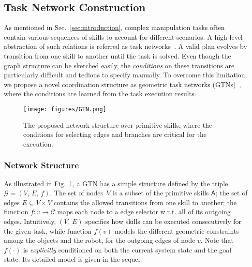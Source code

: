 \subsection{Task Network Construction}\label{subsec:task-network}

As mentioned in Sec.~\ref{sec:introduction}, complex manipulation tasks often contain various sequences of skills to account for different scenarios. 
A high-level abstraction of such relations is referred as task networks~\cite{hayes2016autonomously}.
A valid plan evolves by transition from one skill to another until the task is solved. 
Even though the graph structure can be sketched easily, 
the \emph{conditions} on these transitions are particularly difficult and tedious to specify manually. 
To overcome this limitation,
we propose a novel coordination structure as geometric task networks (GTNs)~\cite{guo2021geometric}, 
where the conditions are learned from the task execution results.


\begin{figure}[t!]
    \centering
    \texttt{[image: figures/GTN.png]}
    \caption{The proposed network structure over primitive skills, 
      where the conditions for selecting edges and branches are critical for the execution.}
    \label{fig:gtn}
    \vspace{-0.15cm}
\end{figure}

\subsubsection{Network Structure}\label{subsubsec:gtn-structure}
As illustrated in Fig.~\ref{fig:gtn}, a GTN has a simple structure defined by the triple $\mathcal{G}=(V,\, E,\, f)$.
The set of nodes~$V$ is a subset of the primitive skills $\mathsf{A}$;
the set of edges $E \subseteq V \times V$ contains the allowed transitions from one skill to another;
the function $f: v \rightarrow \mathcal{C}$ maps each node to a edge selector w.r.t. all of its outgoing edges.
Intuitively, $(V,\, E)$ specifies how skills can be executed consecutively for the given task,
while function $f(v)$ models the different geometric constraints among the objects and the robot,
for the outgoing edges of node $v$.
Note that $f(\cdot)$ is \emph{explicitly} conditioned on both the current system state and the goal state. 
Its detailed model is given in the sequel.

